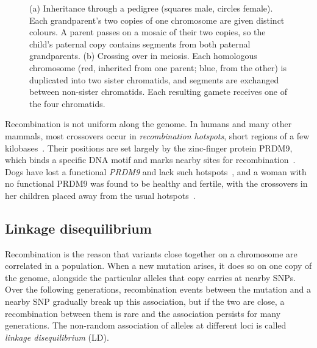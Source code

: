 \begin{figure}[!htbp]
\begin{subfigure}[b]{0.4\linewidth}
    \caption{}
  \end{subfigure}
  \caption{(a) Inheritance through a pedigree (squares male, circles female). Each grandparent's two copies of one chromosome are given distinct colours. A parent passes on a mosaic of their two copies, so the child's paternal copy contains segments from both paternal grandparents. (b) Crossing over in meiosis. Each homologous chromosome (red, inherited from one parent; blue, from the other) is duplicated into two sister chromatids, and segments are exchanged between non-sister chromatids. Each resulting gamete receives one of the four chromatids.}
  \label{fig:recomb}
\end{figure}

Recombination is not uniform along the genome. In humans and many other mammals, most crossovers occur in \emph{recombination hotspots}, short regions of a few kilobases~\citep{myers2005}. Their positions are set largely by the zinc-finger protein PRDM9, which binds a specific DNA motif and marks nearby sites for recombination~\citep{baudat2010}. Dogs have lost a functional \textit{PRDM9} and lack such hotspots~\citep{axelsson2012}, and a woman with no functional PRDM9 was found to be healthy and fertile, with the crossovers in her children placed away from the usual hotspots~\citep{narasimhan2016}.

\subsection{Linkage disequilibrium}

Recombination is the reason that variants close together on a chromosome are correlated in a population. When a new mutation arises, it does so on one copy of the genome, alongside the particular alleles that copy carries at nearby SNPs. Over the following generations, recombination events between the mutation and a nearby SNP gradually break up this association, but if the two are close, a recombination between them is rare and the association persists for many generations. The non-random association of alleles at different loci is called \emph{linkage disequilibrium} (LD).

